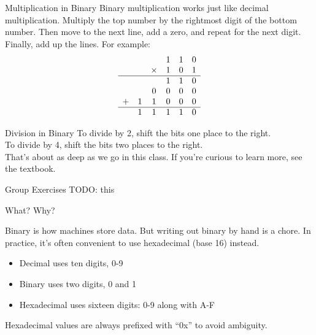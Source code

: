 \begin{frame}{Multiplication in Binary}
	Binary multiplication works just like decimal multiplication.
	Multiply the top number by the rightmost digit of the bottom number.
	Then move to the next line, add a zero, and repeat for the next digit.
	Finally, add up the lines. For example:
	\[
		\begin{array}{cccccc}
			  &   &        & 1 & 1 & 0 \\
			  &   & \times & 1 & 0 & 1 \\
			\hline
			  &   &        & 1 & 1 & 0 \\
			  &   & 0      & 0 & 0 & 0 \\
			+ & 1 & 1      & 0 & 0 & 0 \\
			\hline
			  & 1 & 1      & 1 & 1 & 0 \\
		\end{array}
	\]
\end{frame}

\begin{frame}{Division in Binary}
	To divide by 2, shift the bits one place to the right. \\

	To divide by 4, shift the bits two places to the right. \\

	That's about as deep as we go in this class. If you're curious to learn more,
	see the textbook.

\end{frame}

\begin{frame}{Group Exercises}
TODO: this
\end{frame}



\begin{frame}{What? Why?}

	Binary is how machines store data. But writing out binary by hand is a chore.
	In practice, it's often convenient to use hexadecimal (base 16) instead.

	\begin{itemize}
		\item Decimal uses ten digits, 0-9
		\item Binary uses two digits, 0 and 1
		\item Hexadecimal uses sixteen digits: 0-9 along with A-F
	\end{itemize}
	Hexadecimal values are always prefixed with ``0x'' to avoid ambiguity.
\end{frame}

